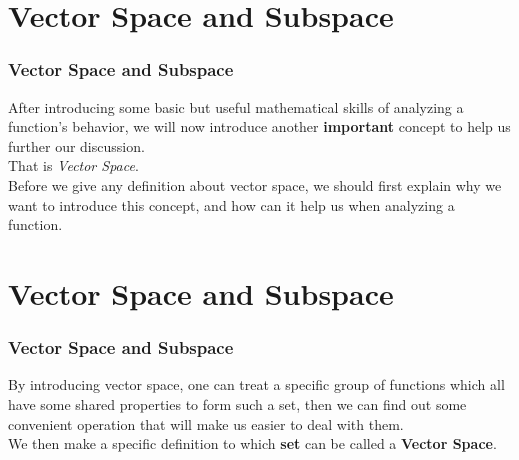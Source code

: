 \documentclass[12pt, t]{beamer}
\renewcommand{\emph}[1]{{\color{Turquoise3}\textsl{#1}}}
\begin{document}
\section{Vector Space and Subspace}
\begin{frame}
    \frametitle{Vector Space and Subspace}

    After introducing some basic but useful mathematical skills of analyzing a function's behavior, we will now introduce another
    \textbf{important} concept to help us further our discussion. \\

    \vspace{1em}
    That is \emph{Vector Space}.\\

    \vspace{1em}
    \hspace{1em}
    Before we give any definition about vector space, we should first explain why we want to introduce this concept, and how can it help us
    when analyzing a function.

\end{frame}

\section{Vector Space and Subspace}
\begin{frame}
    \frametitle{Vector Space and Subspace}

    By introducing vector space, one can treat a specific group of functions which all have some shared properties to form such a set, then
    we can find out some convenient operation that will make us easier to deal with them.\\
    \vspace{1em}
    \hspace{1em}
    We then make a specific definition to which \textbf{set} can be called a \textbf{Vector Space}.

\end{frame}
\end{document}
